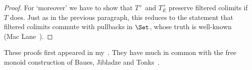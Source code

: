\begin{proof}
For `moreover' we have to show that $T^+$ and $T^+_E$ preserve filtered
colimits if $T$ does.  Just as in the previous paragraph, this reduces to
the statement that filtered colimits commute with pullbacks in $\Set$,
whose truth is well-known (Mac Lane~\cite[IX.2]{MacCWM}).  \done
\end{proof}



\begin{notes}

These proofs first appeared in my~\cite{GECM}.  They have much in common
with the free monoid construction of Baues,%
%
%
Jibladze%
%
%
and Tonks~\cite{BJT}.%
%
%
% 





\end{notes}
